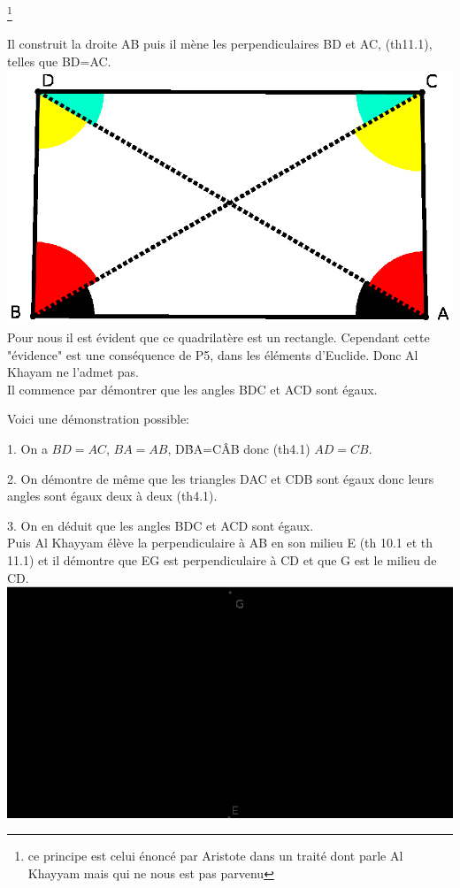 \documentclass[a4paper, 12pt, twoside]{book}
\begin{document}
 \footnote{ce principe est celui énoncé par Aristote dans un traité dont parle Al Khayyam mais qui ne nous est pas parvenu }  
 
 
  Il construit la droite AB puis il mène les perpendiculaires BD et AC, (th11.1), telles que BD=AC.\\
  
  
 \includegraphics[scale=0.6]{figures/KHAYYAM.eps}\\
 
 Pour nous il est évident que ce quadrilatère est un rectangle. Cependant cette "évidence" est une conséquence de P5, dans les éléments d'Euclide. Donc Al Khayam ne l'admet pas.\\
 
 
 
  
  Il commence par démontrer que les angles BDC et ACD sont égaux.\
 

 
 Voici une démonstration possible:\ 
 
 1. On a $BD=AC$, $BA=AB$, D\^{B}A=C\^{A}B donc (th4.1)  $AD=CB$.\
 
 2. On démontre de même que  les triangles DAC et CDB sont égaux donc leurs angles sont égaux deux à deux (th4.1).\
 
 3. On en déduit que les angles BDC et ACD sont égaux.\\
 
 
 Puis Al Khayyam élève la perpendiculaire à AB en son milieu E (th 10.1 et th 11.1) et il démontre que EG est perpendiculaire à CD et que G est le milieu de CD.\\
 
  \includegraphics[scale=0.7]{figures/KHAYYAM1.eps} \\
  
\end{document}
